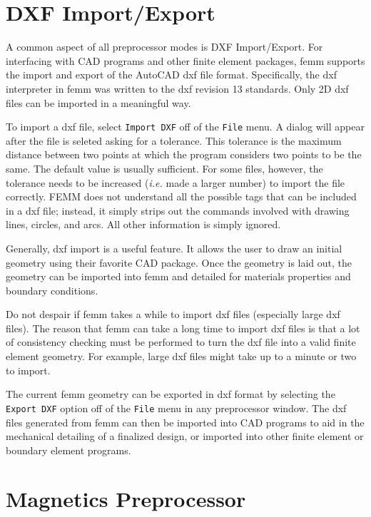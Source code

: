 \documentclass[12pt]{report}
\begin{document}
\section{DXF Import/Export}

A common aspect of all preprocessor modes is DXF Import/Export. For
interfacing with CAD programs and other finite element packages,
femm supports the import and export of the AutoCAD dxf file format.
Specifically, the dxf interpreter in femm was written to the dxf
revision 13 standards. Only 2D dxf files can be imported in a
meaningful way.

To import a dxf file, select \texttt{Import DXF} off of the
\texttt{File} menu. A dialog will appear after the file is seleted
asking for a tolerance. This tolerance is the maximum distance
between two points at which the program considers two points to be
the same. The default value is usually sufficient. For some files,
however, the tolerance needs to be increased ({\em i.e.} made a
larger number) to import the file correctly. FEMM does not
understand all the possible tags that can be included in a dxf
file; instead, it simply strips out the commands involved with
drawing lines, circles, and arcs. All other information is simply
ignored.

Generally, dxf import is a useful feature. It allows the user to
draw an initial geometry using their favorite CAD package. Once the
geometry is laid out, the geometry can be imported into femm and
detailed for materials properties and boundary conditions.

Do not despair if femm takes a while to import dxf files
(especially large dxf files). The reason that femm can take a long
time to import dxf files is that a lot of consistency checking must
be performed to turn the dxf file into a valid finite element
geometry. For example, large dxf files might take up to a minute or
two to import.

The current femm geometry can be exported in dxf format by
selecting the \texttt{Export DXF} option off of the \texttt{File}
menu in any preprocessor window. The dxf files generated from femm
can then be imported into CAD programs to aid in the mechanical
detailing of a finalized design, or imported into other finite
element or boundary element programs.

\section{Magnetics Preprocessor}
\end{document}
